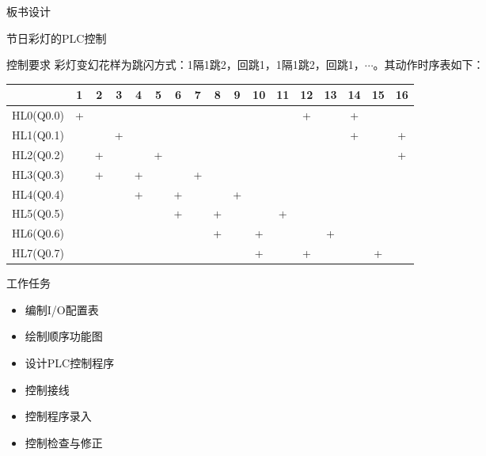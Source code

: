 {\begin{landscape}
\end{landscape}
\clearpage


\begin{center}
{\huge 板书设计}
\end{center}
}

\begin{frame}[containsverbatim]{节日彩灯的PLC控制}
\begin{block}{控制要求}
彩灯变幻花样为跳闪方式：1隔1跳2，回跳1，1隔1跳2，回跳1，$\cdots$。其动作时序表如下：
\begin{table}[htbp]
\begin{tabular}{|c|c|c|c|c|c|c|c|c|c|c|c|c|c|c|c|c|}
\hline
&1&2&3&4&5&6&7&8&9&10&11&12&13&14&15&16\\
\hline
HL0(Q0.0)&+& & & & & & & & & & &+& &+& &\\
\hline
HL1(Q0.1)& & &+& & & & & & & & & & &+& &+\\
\hline
HL2(Q0.2)& &+& & &+& & & & & & & & & & &+\\
\hline
HL3(Q0.3)& &+& &+& & &+& & & & & & & & &\\
\hline
HL4(Q0.4)& & & &+& &+& & &+& & & & & & &\\
\hline
HL5(Q0.5)& & & & & &+& &+& & &+& & & & &\\
\hline
HL6(Q0.6)& & & & & & & &+& &+& & &+& & &\\
\hline
HL7(Q0.7)& & & & & & & & & &+& &+& & & +&\\
\hline
        
\end{tabular}
\end{table}
\end{block}
\end{frame}
\begin{frame}{}
\begin{block}{工作任务}
\begin{itemize}
\item 编制I/O配置表
\item 绘制顺序功能图
\item 设计PLC控制程序
\item 控制接线
\item 控制程序录入
\item 控制检查与修正
\end{itemize}
\end{block}
\end{frame}


\endinput
